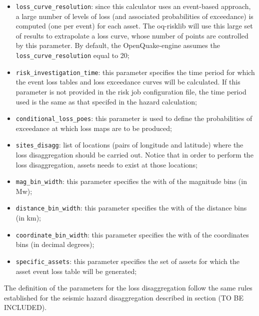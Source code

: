 \begin{itemize}
\item \Verb+loss_curve_resolution+: since this calculator uses an event\--based ap\-proach, a large number of levels of loss (and associated probabilities of exceedance) is computed (one per event) for each asset. The oq-risklib will use this large set of results to extrapolate a loss curve, whose number of points are controlled by this parameter. By default, the OpenQuake-engine assumes the \Verb+loss_curve_resolution+ equal to 20;
\item  \Verb+risk_investigation_time+: this parameter specifies the time period for which the event loss tables and loss exceedance curves will be calculated. If this parameter is not provided in the risk job configuration file, the time period used is the same as that specifed in the hazard calculation;
\item  \Verb+conditional_loss_poes+: this parameter is used to define the probabilities of exceedance at which loss maps are to be produced;
\item  \Verb+sites_disagg+: list of locations (pairs of longitude and latitude) where the loss disaggregation should be carried out. Notice that in order to perform the loss disaggregation, assets needs to exist at those locations;
\item  \Verb+mag_bin_width+: this parameter specifies the with of the magnitude bins (in Mw);
\item  \Verb+distance_bin_width+: this parameter specifies the with of the distance bins (in km);
\item  \Verb+coordinate_bin_width+: this parameter specifies the with of the coordinates bins (in decimal degrees);
\item  \Verb+specific_assets+: this parameter specifies the set of assets for which the asset event loss table will be generated;
\end{itemize}

The definition of the parameters for the loss disaggregation follow the same rules established for the seismic hazard disaggregation described in section (TO BE INCLUDED).

